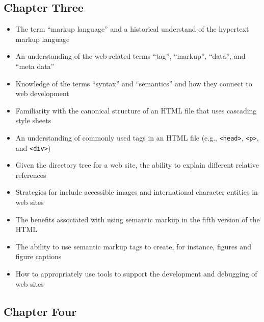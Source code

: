 \documentclass[11pt]{article}
\newcommand{\program}[1]{\lstinline{#1}}
\begin{document}
\vspace*{-.2in}
\subsection*{Chapter Three}

\begin{itemize}

  \itemsep 0.05in

  \item The term ``markup language'' and a historical understand of the
    hypertext markup language
  \item An understanding of the web-related terms ``tag'', ``markup'', ``data'',
    and ``meta data''
  \item Knowledge of the terms ``syntax'' and ``semantics'' and how they
    connect to web development
  \item Familiarity with the canonical structure of an HTML file that
    uses cascading style sheets
  \item An understanding of commonly used tags in an HTML file (e.g., \program{<head>},
    \program{<p>}, and \program{<div>})
  \item Given the directory tree for a web site, the ability to explain
    different relative references
  \item Strategies for include accessible images and international character
    entities in web sites
  \item The benefits associated with using semantic markup in the fifth version
    of the HTML
  \item The ability to use semantic markup tags to create, for instance, figures
    and figure captions
  \item How to appropriately use tools to support the development and
    debugging of web sites

\end{itemize}

\vspace*{-.2in}
\subsection*{Chapter Four}
\end{document}

